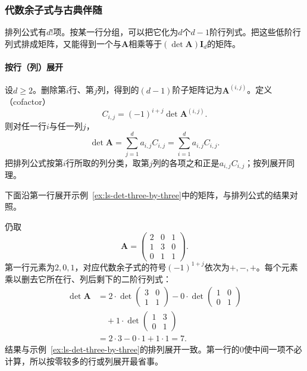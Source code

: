 \subsubsection{代数余子式与古典伴随}
\label{sec:ls-det-cofactor-adjugate}

排列公式有$d!$项。按某一行分组，可以把它化为$d$个$d-1$阶行列式。把这些低阶行列式排成矩阵，又能得到一个与$\bm A$相乘等于$(\det\bm A)\bm I_d$的矩阵。

\paragraph{按行（列）展开}
设$d\geq2$。删除第$i$行、第$j$列，得到的$(d-1)$阶子矩阵记为$\bm A^{(i,j)}$。定义（cofactor）
\[
 C_{i,j}=(-1)^{i+j}\det\bm A^{(i,j)}.
\]
则对任一行$i$与任一列$j$，
\begin{equation}
 \det\bm A=\sum_{j=1}^d a_{i,j}C_{i,j}=\sum_{i=1}^d a_{i,j}C_{i,j}.
 \label{eq:ls-cofactor-expansion}
\end{equation}
把排列公式按第$i$行所取的列分类，取第$j$列的各项之和正是$a_{i,j}C_{i,j}$；按列展开同理。

下面沿第一行展开示例~\ref{ex:ls-det-three-by-three}中的矩阵，与排列公式的结果对照。
\begin{example}[沿第一行展开三阶行列式]
\label{ex:ls-det-cofactor-expansion}
仍取
\[
 \bm A=\begin{pmatrix}2&0&1\\1&3&0\\0&1&1\end{pmatrix}.
\]
第一行元素为$2,0,1$，对应代数余子式的符号$(-1)^{1+j}$依次为$+,-,+$。每个元素乘以删去它所在行、列后剩下的二阶行列式：
\[
 \begin{aligned}
 \det\bm A
 &=2\cdot\det\begin{pmatrix}3&0\\1&1\end{pmatrix}
 -0\cdot\det\begin{pmatrix}1&0\\0&1\end{pmatrix}\\
 &\quad+1\cdot\det\begin{pmatrix}1&3\\0&1\end{pmatrix}\\
 &=2\cdot3-0\cdot1+1\cdot1=7.
 \end{aligned}
\]
结果与示例~\ref{ex:ls-det-three-by-three}的排列展开一致。第一行的$0$使中间一项不必计算，所以按零较多的行或列展开最省事。
\end{example}

